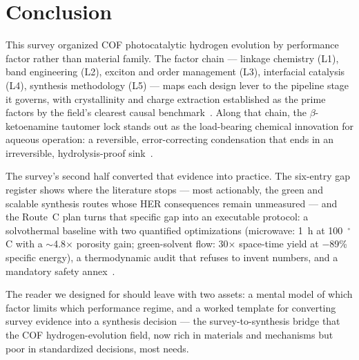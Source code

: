 \section{Conclusion}
\label{sec:conclusion}

This survey organized COF photocatalytic hydrogen evolution by performance factor rather than
material family. The factor chain --- linkage chemistry (L1), band engineering (L2), exciton
and order management (L3), interfacial catalysis (L4), synthesis methodology (L5) --- maps each
design lever to the pipeline stage it governs, with crystallinity and charge extraction
established as the prime factors by the field's clearest causal
benchmark~\cite{ghosh2020identification}. Along that chain, the $\beta$-ketoenamine tautomer
lock stands out as the load-bearing chemical innovation for aqueous operation: a reversible,
error-correcting condensation that ends in an irreversible, hydrolysis-proof
sink~\cite{kandambeth2012construction}.

The survey's second half converted that evidence into practice. The six-entry gap register
shows where the literature stops --- most actionably, the green and scalable synthesis routes
whose HER consequences remain unmeasured --- and the Route~C plan turns that specific gap into
an executable protocol: a solvothermal baseline with two quantified optimizations (microwave:
1~h at 100~$^\circ$C with a $\sim$4.8$\times$ porosity gain; green-solvent flow: 30$\times$
space-time yield at $-$89\% specific energy), a thermodynamic audit that refuses to invent
numbers, and a mandatory safety annex~\cite{grenu2020microwave,xu2026structural}.

The reader we designed for should leave with two assets: a mental model of which factor limits
which performance regime, and a worked template for converting survey evidence into a synthesis
decision --- the survey-to-synthesis bridge that the COF hydrogen-evolution field, now rich in
materials and mechanisms but poor in standardized decisions, most needs.
